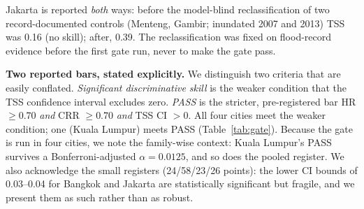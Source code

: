 \documentclass[conference]{IEEEtran}
\begin{document}
\begin{table}[t]
\centering
\caption{Documented-hotspot gate (present-day, RP100, $\geq 0.10$~m, 50~m). PASS $=$ HR $\geq 0.70 \wedge$ CRR $\geq 0.70 \wedge$ TSS CI $>0$.}
\label{tab:gate}
\small
\setlength{\tabcolsep}{4pt}

\vspace{2pt}
\footnotesize
Jakarta is reported \emph{both} ways: before the model-blind reclassification of two record-documented controls (Menteng, Gambir; inundated 2007 and 2013) TSS was 0.16 (no skill); after, 0.39. The reclassification was fixed on flood-record evidence before the first gate run, never to make the gate pass.
\end{table}

\textbf{Two reported bars, stated explicitly.} We distinguish two criteria that are easily conflated. \emph{Significant discriminative skill} is the weaker condition that the TSS confidence interval excludes zero. \emph{PASS} is the stricter, pre-registered bar HR $\geq 0.70$ \emph{and} CRR $\geq 0.70$ \emph{and} TSS CI $>0$. All four cities meet the weaker condition; one (Kuala Lumpur) meets PASS (Table~\ref{tab:gate}). Because the gate is run in four cities, we note the family-wise context: Kuala Lumpur's PASS survives a Bonferroni-adjusted $\alpha = 0.0125$, and so does the pooled register. We also acknowledge the small registers (24/58/23/26 points): the lower CI bounds of 0.03--0.04 for Bangkok and Jakarta are statistically significant but fragile, and we present them as such rather than as robust.
\end{document}
